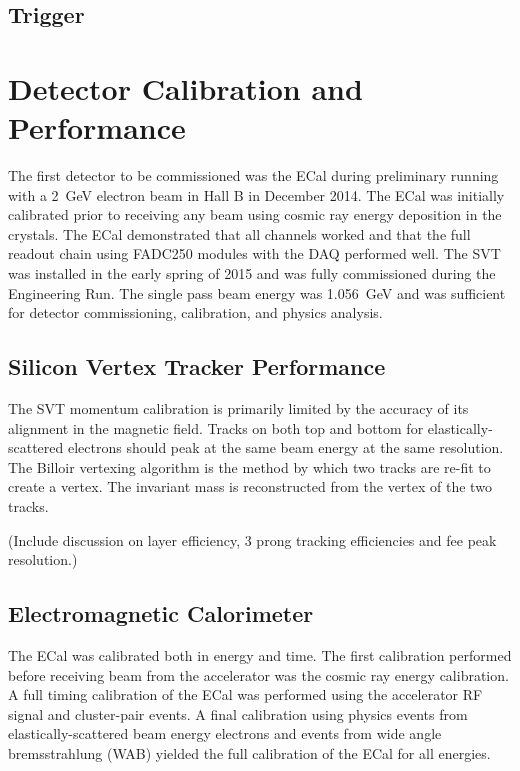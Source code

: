 \documentclass[12pt]{report}
\begin{document}
\section{Trigger}


\chapter{Detector Calibration and Performance} 
The first detector to be commissioned was the ECal during preliminary running with a 2~GeV electron beam in Hall B in December 2014. The ECal was initially calibrated prior to receiving any beam using cosmic ray energy deposition in the crystals. The ECal demonstrated that all channels worked and that the full readout chain using FADC250 modules with the DAQ performed well. The SVT was installed in the early spring of 2015 and was fully commissioned during the Engineering Run. The single pass beam energy was 1.056~GeV and was sufficient for detector commissioning, calibration, and physics analysis. 

\section{Silicon Vertex Tracker Performance}
The SVT momentum calibration is primarily limited by the accuracy of its alignment in the magnetic field. Tracks on both top and bottom for elastically-scattered electrons should peak at the same beam energy at the same resolution. The Billoir vertexing algorithm is the method by which two tracks are re-fit to create a vertex. The invariant mass is reconstructed from the vertex of the two tracks. 



(Include discussion on layer efficiency, 3 prong tracking efficiencies and fee peak resolution.)

\section{Electromagnetic Calorimeter}
The ECal was calibrated both in energy and time. The first calibration performed before receiving beam from the accelerator was the cosmic ray energy calibration. A full timing calibration of the ECal was performed using the accelerator RF signal and cluster-pair events. A final calibration using physics events from elastically-scattered beam energy electrons and events from wide angle bremsstrahlung (WAB) yielded the full calibration of the ECal for all energies.  
\end{document}
